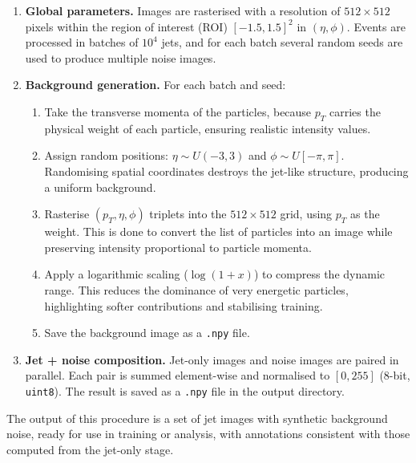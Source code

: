 \begin{enumerate}
    \item \textbf{Global parameters.} 
    Images are rasterised with a resolution of $512\times512$ pixels within the region of interest (ROI) $[-1.5,1.5]^2$ in $(\eta,\phi)$. Events are processed in batches of $10^{4}$ jets, and for each batch several random seeds are used to produce multiple noise images.  

    \item \textbf{Background generation.} 
    For each batch and seed:
    \begin{enumerate}
        \item Take the transverse momenta of the particles, because $p_{T}$ carries the physical weight of each particle, ensuring realistic intensity values.  

        \item Assign random positions: $\eta \sim U(-3,3)$ and $\phi \sim U[-\pi,\pi]$. Randomising spatial coordinates destroys the jet-like structure, producing a uniform background.  

        \item Rasterise $(p_{T},\eta,\phi)$ triplets into the $512\times512$ grid, using $p_{T}$ as the weight. This is done to convert the list of particles into an image while preserving intensity proportional to particle momenta.  

        \item Apply a logarithmic scaling ($\log(1+x)$) to compress the dynamic range. This reduces the dominance of very energetic particles, highlighting softer contributions and stabilising training.  

        \item Save the background image as a \texttt{.npy} file.    
    \end{enumerate}

    \item \textbf{Jet + noise composition.} 
    Jet-only images and noise images are paired in parallel. Each pair is summed element-wise and normalised to $[0,255]$ (8-bit, \texttt{uint8}). The result is saved as a \texttt{.npy} file in the output directory.  
\end{enumerate}

The output of this procedure is a set of jet images with synthetic background noise, ready for use in training or analysis, with annotations consistent with those computed from the jet-only stage.

